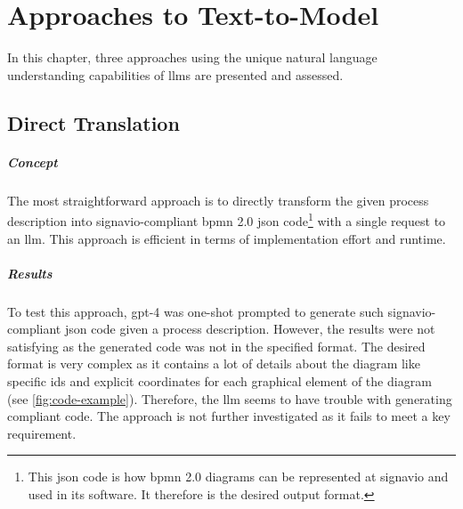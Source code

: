 

\chapter{Approaches to Text-to-Model}
In this chapter, three approaches using the unique natural language understanding capabilities of \acsp{llm} are presented and assessed.

\section{Direct Translation}\label{sec:direct-translation}
\paragraph{Concept}
The most straightforward approach is to directly transform the given process description into \gls{signavio}-compliant \acs{bpmn} 2.0 \acs{json} code\footnote{This \acs{json} code is how \acs{bpmn} 2.0 diagrams can be represented at \gls{signavio} and used in its software. It therefore is the desired output format.} with a single request to an \gls{llm}. This approach is efficient in terms of implementation effort and runtime.

\paragraph{Results}
To test this approach, \acs{gpt}-4 was one-shot prompted to generate such \gls{signavio}-compliant \acs{json} code given a process description. However, the results were not satisfying as the generated code was not in the specified format. The desired format is very complex as it contains a lot of details about the diagram like specific \acsp{id} and explicit coordinates for each graphical element of the diagram (see \autoref{fig:code-example}). Therefore, the \gls{llm} seems to have trouble with generating compliant code. The approach is not further investigated as it fails to meet a key requirement.


